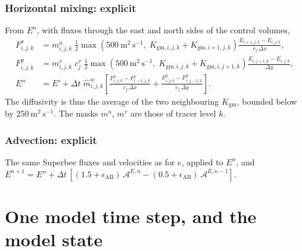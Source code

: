 \documentclass{article}
\begin{document}
\subsubsection*{Horizontal mixing: explicit}
From $E^n$, with fluxes through the east and north sides of the control volumes,
\begin{align*}
F^x_{i,j,k} &= m^u_{i,j,k}\;\tfrac12\max\!\left( 500~\text{m}^2\,\text{s}^{-1},\; K_{\text{gm},i,j,k} + K_{\text{gm},i+1,j,k} \right) \frac{E_{i+1,j,k} - E_{i,j,k}}{c_j\,\Delta x}, \\
F^y_{i,j,k} &= m^v_{i,j,k}\;c^v_j\;\tfrac12\max\!\left( 500~\text{m}^2\,\text{s}^{-1},\; K_{\text{gm},i,j,k} + K_{\text{gm},i,j+1,k} \right) \frac{E_{i,j+1,k} - E_{i,j,k}}{\Delta y}, \\
E'' &= E' + \Delta t\;\hat m^w_{i,j,k}\left[ \frac{F^x_{i,j,k} - F^x_{i-1,j,k}}{c_j\,\Delta x} + \frac{F^y_{i,j,k} - F^y_{i,j-1,k}}{c_j\,\Delta y} \right].
\end{align*}
The diffusivity is thus the average of the two neighbouring $K_\text{gm}$, bounded below by $250~\text{m}^2\,\text{s}^{-1}$. The masks $m^u$, $m^v$ are those of tracer level $k$.

\subsubsection*{Advection: explicit}
The same Superbee fluxes and velocities as for $e$, applied to $E^n$, and
$E^{n+1} = E'' + \Delta t\,[(1.5+\epsilon_\text{AB})\,\mathcal{A}^{E,n} - (0.5+\epsilon_\text{AB})\,\mathcal{A}^{E,n-1}]$.

\section{One model time step, and the model state}\label{sec:step}
\end{document}
